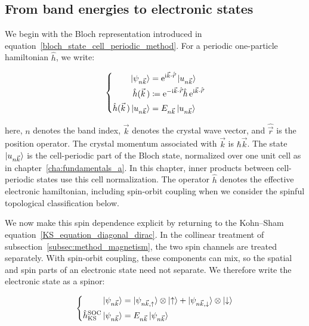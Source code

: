 \subsection{From band energies to electronic states}
\label{subsec:method_topology}

We begin with the Bloch representation introduced in equation~\eqref{bloch_state_cell_periodic_method}.
For a periodic one-particle hamiltonian $\hat{h}$, we write:

\begin{equation}
\left\{\begin{aligned}
    \ket{\psi_{n\vec{k}}}
    &=\mathrm{e}^{\mathrm{i}\vec{k}\cdot\hat{\vec{r}}}\ket{u_{n\vec{k}}} \\
    \hat{h}(\vec{k}\,)
    &\coloneqq\mathrm{e}^{-\mathrm{i}\vec{k}\cdot\hat{\vec{r}}}
    \hat{h}\,\mathrm{e}^{\mathrm{i}\vec{k}\cdot\hat{\vec{r}}} \\
    \hat{h}(\vec{k}\,)\ket{u_{n\vec{k}}}
    &=E_{n\vec{k}}\ket{u_{n\vec{k}}}
\end{aligned}\right.
\label{bloch_hamiltonian_topology}
\end{equation}

here, $n$ denotes the band index, $\vec{k}$ denotes the crystal wave vector,
and $\hat{\vec{r}}$ is the position operator.
The crystal momentum associated with $\vec{k}$ is $\hbar\vec{k}$.
The state $\ket{u_{n\vec{k}}}$ is the cell-periodic part of the Bloch state,
normalized over one unit cell as in chapter~\ref{cha:fundamentals_a}.
In this chapter, inner products between cell-periodic states use this cell normalization.
The operator $\hat{h}$ denotes the effective electronic hamiltonian,
including spin-orbit coupling when we consider the spinful topological classification below.

We now make this spin dependence explicit by returning to the Kohn--Sham equation~\eqref{KS_equation_diagonal_dirac}.
In the collinear treatment of subsection~\ref{subsec:method_magnetism}, the two spin channels are treated separately.
With spin-orbit coupling, these components can mix, so the spatial and spin parts of an electronic state need not separate.
We therefore write the electronic state as a spinor:

\begin{equation}
\left\{\begin{aligned}
    \ket{\psi_{n\vec{k}}}
    &=
    \ket{\psi_{n\vec{k},\uparrow}}\otimes\ket{\uparrow}
    +
    \ket{\psi_{n\vec{k},\downarrow}}\otimes\ket{\downarrow} \\
    \hat{h}_\mathrm{KS}^\mathrm{SOC}\ket{\psi_{n\vec{k}}}
    &=E_{n\vec{k}}\ket{\psi_{n\vec{k}}}
\end{aligned}\right.
\label{KS_spinor_equation_method}
\end{equation}

